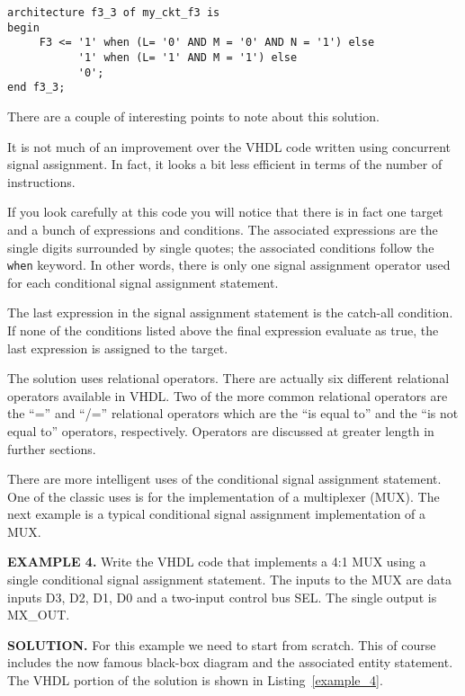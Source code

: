 \noindent
\begin{minipage}{0.99\linewidth}
\begin{lstlisting}[label=example_3, caption=Solution of Example~3.]
architecture f3_3 of my_ckt_f3 is
begin
     F3 <= '1' when (L= '0' AND M = '0' AND N = '1') else
           '1' when (L= '1' AND M = '1') else
           '0';
end f3_3;
\end{lstlisting}
\end{minipage}

There are a couple of interesting points to note about this solution.
\begin{my_list}
\item It is not much of an improvement over the VHDL code written using concurrent signal assignment. In fact, it looks a bit less efficient in terms of the number of instructions.
\item If you look carefully at this code you will notice that there is in fact one target and a bunch of expressions and conditions. The associated expressions are the single digits surrounded by single quotes; the associated conditions follow the \texttt{when} keyword. In other words, there is only one signal assignment operator used for each conditional signal assignment statement.
\item The last expression in the signal assignment statement is the catch-all condition. If none of the conditions listed above the final expression evaluate as true, the last expression is assigned to the target.
\item The solution uses relational operators. There are actually six different relational operators available in VHDL. Two of the more common relational operators are the ``='' and ``/='' relational operators which are the ``is equal to'' and the ``is not equal to'' operators, respectively. Operators are discussed at greater length in further sections.
\end{my_list}
There are more intelligent uses of the conditional signal assignment statement. One of the classic uses is for the implementation of a multiplexer (MUX). The next example is a typical conditional signal assignment implementation of a MUX.

\begin{leftbar}
\noindent
\textbf{EXAMPLE 4.}
Write the VHDL code that implements a 4:1 MUX using a single conditional signal assignment statement. The inputs to the MUX are data inputs D3, D2, D1, D0 and a two-input control bus SEL. The single output is MX\_OUT.
\end{leftbar}
\noindent
\textbf{SOLUTION.} For this example we need to start from scratch. This of course includes the now famous black-box diagram and the associated entity statement. The VHDL portion of the solution is shown in Listing~\ref{example_4}.

